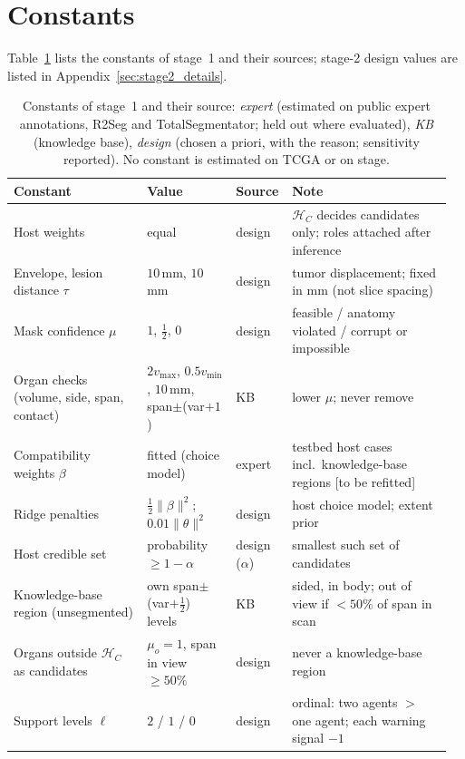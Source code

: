 \documentclass[fleqn,10pt]{olplainarticle}
\begin{document}
\section{Constants}
\label{app:constants}
Table~\ref{tab:constants} lists the constants of stage~1 and their sources; stage-2 design values are listed in
Appendix~\ref{sec:stage2_details}.

\begin{table}[t]
\centering\footnotesize
\caption{Constants of stage~1 and their source: \emph{expert} (estimated on public expert
annotations, R2Seg and TotalSegmentator; held out where evaluated), \emph{KB} (knowledge base), \emph{design} (chosen a priori,
with the reason; sensitivity reported). No constant is estimated on TCGA or on stage.}
\label{tab:constants}
\setlength{\tabcolsep}{3pt}
\begin{tabular}{p{0.30\linewidth}p{0.20\linewidth}p{0.10\linewidth}p{0.36\linewidth}}
\hline
Constant & Value & Source & Note\\
\hline
Host weights & equal & design & $\mathcal{H}_C$ decides candidates only; roles attached after inference\\
Envelope, lesion distance $\tau$ & $10$\,mm, $10$\,mm & design & tumor displacement; fixed in mm (not slice spacing)\\
Mask confidence $\mu$ & $1$, $\tfrac12$, $0$ & design & feasible / anatomy violated / corrupt or impossible\\
Organ checks (volume, side, span, contact) & $2v_{\max}$, $0.5v_{\min}$, $10$\,mm, span$\pm$(var$+1$) & KB & lower $\mu$; never remove\\
Compatibility weights $\beta$ & fitted (choice model) & expert & testbed host cases incl.\ knowledge-base regions [to be refitted]\\
Ridge penalties & $\tfrac12\|\beta\|^2$; $0.01\|\theta\|^2$ & design & host choice model; extent prior\\
Host credible set & probability $\ge1-\alpha$ & design ($\alpha$) & smallest such set of candidates\\
Knowledge-base region (unsegmented) & own span$\pm$(var$+\tfrac12$) levels & KB & sided, in body; out of view if $<50\%$ of span in scan\\
Organs outside $\mathcal{H}_C$ as candidates & $\mu_o=1$, span in view $\ge50\%$ & design & never a knowledge-base region\\
Support levels $\ell$ & $2$ / $1$ / $0$ & design & ordinal: two agents $>$ one agent; each warning signal $-1$\\

\end{tabular}
\end{table}
\end{document}
